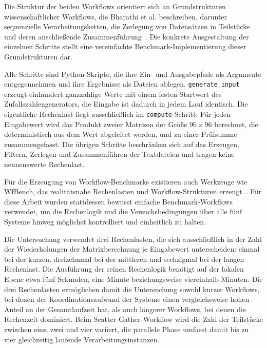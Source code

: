Die Struktur der beiden Workflows orientiert sich an
Grundstrukturen wissenschaftlicher Workflows, die Bharathi et al.
beschreiben, darunter sequenzielle Verarbeitungsketten, die
Zerlegung von Datensätzen in Teilstücke und deren anschließende
Zusammenführung~\cite[S.~3]{bharathi2008characterization}.
Die konkrete Ausgestaltung der einzelnen Schritte stellt eine
vereinfachte Benchmark-Implementierung dieser Grundstrukturen dar.

\begin{sloppypar}
Alle Schritte sind Python-Skripte, die ihre Ein- und Ausgabepfade
als Argumente entgegennehmen und ihre Ergebnisse als Dateien
ablegen. \texttt{generate\_input} erzeugt einhundert ganzzahlige
Werte mit einem festen Startwert des Zufallszahlengenerators, die
Eingabe ist dadurch in jedem Lauf identisch. Die eigentliche
Rechenlast liegt ausschließlich im \texttt{compute}-Schritt: Für
jeden Eingabewert wird das Produkt zweier Matrizen der Größe
$96 \times 96$ berechnet, die deterministisch aus dem Wert
abgeleitet werden, und zu einer Prüfsumme zusammengefasst. Die
übrigen Schritte beschränken sich auf das Erzeugen, Filtern,
Zerlegen und Zusammenführen der Textdateien und tragen keine
nennenswerte Rechenlast.
\end{sloppypar}

Für die Erzeugung von Workflow-Benchmarks existieren auch Werkzeuge
wie WfBench, das realitätsnahe Rechenlasten und Workflow-Strukturen
erzeugt~\cite[S.~101]{wfbench2022}. Für diese Arbeit wurden
stattdessen bewusst einfache Benchmark-Workflows verwendet, um die
Rechenlogik und die Versuchsbedingungen über alle fünf Systeme
hinweg möglichst kontrolliert und einheitlich zu halten.

Die Untersuchung verwendet drei Rechenlasten, die sich
ausschließlich in der Zahl der Wiederholungen der Matrixberechnung
je Eingabewert unterscheiden: einmal bei der kurzen, dreizehnmal
bei der mittleren und sechzigmal bei der langen Rechenlast. Die
Ausführung der reinen Rechenlogik benötigt auf der lokalen Ebene
etwa fünf Sekunden, eine Minute beziehungsweise viereinhalb
Minuten. Die drei Rechenlasten ermöglichen damit die Untersuchung
sowohl kurzer Workflows, bei denen der Koordinationsaufwand der
Systeme einen vergleichsweise hohen Anteil an der Gesamtlaufzeit
hat, als auch längerer Workflows, bei denen die Rechenzeit
dominiert. Beim Scatter-Gather-Workflow wird die Zahl der
Teilstücke zwischen eins, zwei und vier variiert, die parallele
Phase umfasst damit bis zu vier gleichzeitig laufende
Verarbeitungsinstanzen.

